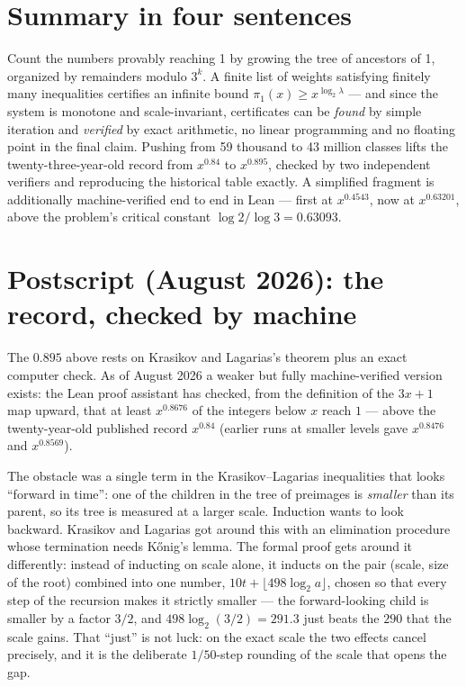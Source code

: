 \documentclass[11pt]{article}
\begin{document}
\section{Summary in four sentences}

Count the numbers provably reaching 1 by growing the tree of ancestors
of 1, organized by remainders modulo $3^k$. A finite list of weights
satisfying finitely many inequalities certifies an infinite bound
$\pi_1(x) \ge x^{\log_2 \lambda}$ --- and since the system is monotone
and scale-invariant, certificates can be \emph{found} by simple
iteration and \emph{verified} by exact arithmetic, no linear
programming and no floating point in the final claim. Pushing from
59 thousand to 43 million classes lifts the twenty-three-year-old
record from $x^{0.84}$ to $x^{0.895}$, checked by two independent
verifiers and reproducing the historical table exactly. A simplified
fragment is additionally machine-verified end to end in Lean --- first
at $x^{0.4543}$, now at $x^{0.63201}$, above the problem's critical
constant $\log 2/\log 3 = 0.63093$.

\section*{Postscript (August 2026): the record, checked by machine}

The $0.895$ above rests on Krasikov and Lagarias's theorem plus an
exact computer check. As of August 2026 a weaker but fully
machine-verified version exists: the Lean proof assistant has checked,
from the definition of the $3x+1$ map upward, that at least
$x^{0.8676}$ of the integers below $x$ reach $1$ --- above the
twenty-year-old published record $x^{0.84}$ (earlier runs at smaller
levels gave $x^{0.8476}$ and $x^{0.8569}$).

The obstacle was a single term in the Krasikov--Lagarias inequalities
that looks ``forward in time'': one of the children in the tree of
preimages is \emph{smaller} than its parent, so its tree is measured
at a larger scale. Induction wants to look backward. Krasikov and
Lagarias got around this with an elimination procedure whose
termination needs K\H{o}nig's lemma. The formal proof gets around it
differently: instead of inducting on scale alone, it inducts on the
pair (scale, size of the root) combined into one number,
$10t + \lfloor 498 \log_2 a\rfloor$, chosen so that every step of the
recursion makes it strictly smaller --- the forward-looking child is
smaller by a factor $3/2$, and $498 \log_2(3/2) = 291.3$ just beats the
$290$ that the scale gains. That ``just'' is not luck: on the exact
scale the two effects cancel precisely, and it is the deliberate
$1/50$-step rounding of the scale that opens the gap.
\end{document}
